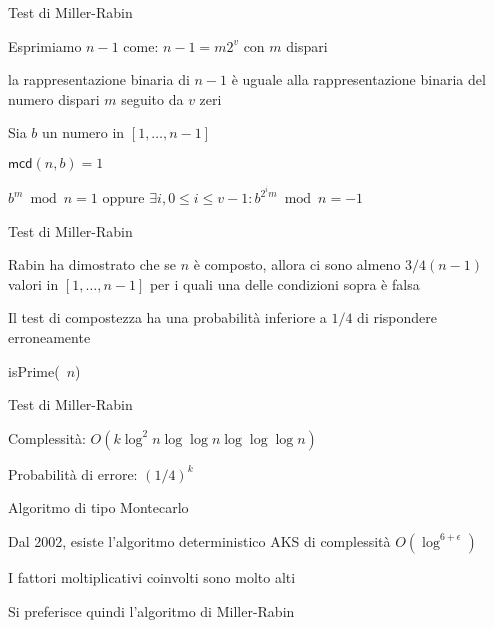 \begin{frame}{Test di Miller-Rabin}

\BIL
\item Esprimiamo $n-1$ come: $n-1 = m 2^v$ con $m$ dispari
  \BI
  \item la rappresentazione binaria di $n-1$ è uguale alla rappresentazione 
    binaria del numero dispari $m$ seguito da $v$ zeri
  \EI
\item Sia $b$ un numero in $[1, \ldots, n-1]$
\EIL

\bigskip
\begin{overprint}
\end{overprint}
\BEL
\item $\textsf{mcd}(n,b) = 1$
\item $b^m \bmod n = 1$ oppure $\exists i, 0 \leq i \leq v-1: b^{2^im} \bmod n = -1$
\EEL
      
\end{frame}

\begin{frame}{Test di Miller-Rabin}

\BIL
\item Rabin ha dimostrato che se $n$ è composto, allora ci sono
almeno $3/4(n-1)$ valori in $[1, \ldots, n-1]$ per i quali una delle condizioni sopra è falsa
\item Il test di compostezza ha una probabilità inferiore a $1/4$ di rispondere
erroneamente
\EIL

\begin{Procedure}
\caption[A]{\textsf{isPrime}(\INTEGER\ $n$)}
\Return \TRUE\;
\end{Procedure}

\end{frame}

\begin{frame}{Test di Miller-Rabin}

\BIL
\item Complessità: $O(k \log^2 n \log \log n \log \log \log n)$
\item Probabilità di errore: $(1/4)^k$
\item Algoritmo di tipo Montecarlo
\EIL

\bigskip
{}
\BIL
\item Dal 2002, esiste l'algoritmo deterministico AKS di complessità $O(\log^{6+\epsilon})$
\item I fattori moltiplicativi coinvolti sono molto alti
\item Si preferisce quindi l'algoritmo di Miller-Rabin
\EIL

\end{frame}

